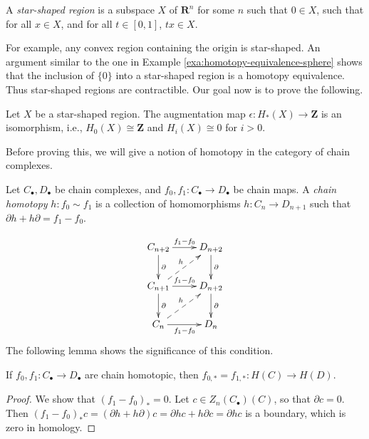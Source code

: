 \begin{definition}
	A \emph{star-shaped region} is a subspace $X$ of $\mathbf{R}^n$ for some $n$ such that $0\in X$, such that for all $x\in X$, and for all $t\in[0,1]$, $tx\in X$. 
\end{definition}
For example, any convex region containing the origin is star-shaped. An argument similar to the one in Example \ref{exa:homotopy-equivalence-sphere} shows that the inclusion of $\{0\}$ into a star-shaped region is a homotopy equivalence. Thus star-shaped regions are contractible. Our goal now is to prove the following.
\begin{theorem}
	Let $X$ be a star-shaped region. The augmentation map $\epsilon: H_\ast(X)\to \mathbf{Z}$ is an isomorphism, i.e., $ H_0(X)\cong\mathbf{Z}$ and $ H_i(X)\cong 0$ for $i>0$.
\end{theorem}
Before proving this, we will give a notion of homotopy in the category of chain complexes.
\begin{definition}
Let $C_\bullet,D_\bullet$ be chain complexes, and $f_0,f_1:C_\bullet\to D_\bullet$ be chain maps. A \emph{chain homotopy} $h:f_0\sim f_1$ is a collection of homomorphisms $h:C_n\to D_{n+1}$ such that $\partial h+h\partial=f_1-f_0$.
\end{definition}
			\begin{equation*}
			\xymatrix{C_{n+2}\ar[r]^{f_1-f_0}\ar[d]^\partial & D_{n+2}\ar[d]^\partial\\
			C_{n+1}\ar@{-->}[ur]^h\ar[r]^{f_1-f_0}\ar[d]^\partial & D_{n+2}\ar[d]^\partial\\
			C_n\ar@{-->}[ur]^h\ar[r]_{f_1-f_0} & D_n}
			\end{equation*}
The following lemma shows the significance of this condition.
	\begin{lemma}
	If $f_0,f_1:C_\bullet\to D_\bullet$ are chain homotopic, then $f_{0,\ast}=f_{1,\ast}: H(C)\to H(D)$.
	\end{lemma}
		\begin{proof}
		We show that $(f_1-f_0)_\ast=0$. Let $c\in Z_n(C_\bullet)(C)$, so that $\partial c=0$. Then $(f_1-f_0)_\ast c=(\partial h+h\partial)c=\partial hc+h\partial c=\partial hc$ is a boundary, which is zero in homology.
		\end{proof}
